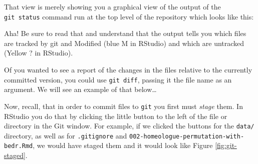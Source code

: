 \documentclass[]{krantz}
\makeatletter
\newenvironment{Shaded}{\begin{snugshade}}{\end{snugshade}}
\newcommand{\ExtensionTok}[1]{#1}
\newcommand{\KeywordTok}[1]{\textcolor[rgb]{0.27,0.27,0.27}{\textbf{#1}}}
\newcommand{\NormalTok}[1]{#1}
\newcommand{\StringTok}[1]{\textcolor[rgb]{0.5,0.5,0.5}{#1}}
\newenvironment{kframe}{%
\medskip{}
\setlength{\fboxsep}{.8em}
 \def\at@end@of@kframe{}%
 \ifinner\ifhmode%
  \def\at@end@of@kframe{\end{minipage}}%
  \begin{minipage}{\columnwidth}%
 \fi\fi%
 \def\FrameCommand##1{\hskip\@totalleftmargin \hskip-\fboxsep
 \colorbox{shadecolor}{##1}\hskip-\fboxsep
     \hskip-\linewidth \hskip-\@totalleftmargin \hskip\columnwidth}%
 \MakeFramed {\advance\hsize-\width
   \@totalleftmargin\z@ \linewidth\hsize
   \@setminipage}}%
 {\par\unskip\endMakeFramed%
 \at@end@of@kframe}
\renewenvironment{Shaded}{\begin{kframe}}{\end{kframe}}
\makeatother
\begin{document}
That view is merely showing you a graphical view of the output of
the \texttt{git\ status} command run at the top level of the repository which
looks like this:

\begin{Shaded}
\end{Shaded}

Aha! Be sure to read that and understand that the output tells you which
files are tracked by git and Modified (blue M in RStudio) and which
are untracked (Yellow ? in RStudio).

Of you wanted to see a report of the changes in the files relative
to the currently committed version, you could use \texttt{git\ diff}, passing
it the file name as an argument. We will see an example of that below\ldots{}

Now, recall, that in order to commit files to \texttt{git} you first must
\emph{stage} them. In RStudio you do that by clicking the little button to
the left of the file or directory in the Git window. For example,
if we clicked the buttons for the \texttt{data/} directory, as well as for
\texttt{.gitignore} and \texttt{002-homeologue-permutation-with-bedr.Rmd}, we would
have staged them and it would look like Figure \ref{fig:git-staged}.
\end{document}
